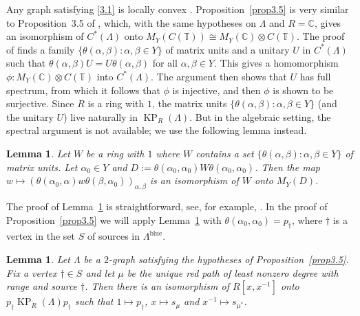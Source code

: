 \documentclass[a4paper,12pt]{amsart}
\numberwithin{equation}{section}
\newtheorem{lemma}[thm]{Lemma}
\theoremstyle{definition}
\theoremstyle{remark}
\begin{document}
Any graph satisfying \eqref{3.1}  is locally convex \cite[page~141]{PRRS}.
Proposition~\ref{prop3.5} is very similar to Proposition~3.5 of \cite{PRRS}, which, with the same hypotheses on $\Lambda$ and $R={\mathbb{C}}$, gives an isomorphism of $C^*(\Lambda)$ onto $M_Y(C({\mathbb{T}}))\cong M_Y({\mathbb{C}})\otimes C({\mathbb{T}})$. The proof of \cite[Proposition~3.5]{PRRS} finds a family $\{\theta(\alpha,\beta):\alpha,\beta\in Y\}$ of matrix units  and a unitary $U$ in $C^*(\Lambda)$ such that $\theta(\alpha,\beta)U=U\theta(\alpha,\beta)$ for all $\alpha, \beta\in Y$.  This gives a homomorphism $\phi:M_Y({\mathbb{C}})\otimes C({\mathbb{T}})$ into $C^*(\Lambda)$.  The argument then shows that $U$ has full spectrum, from which it follows that $\phi$ is injective, and then $\phi$ is shown to be surjective.
Since $R$ is a ring with $1$, the  matrix units $\{\theta(\alpha,\beta):\alpha,\beta\in Y\}$ (and the unitary $U$) live naturally in $\operatorname{KP}_R(\Lambda)$. But in the algebraic setting, the spectral argument is not available; we  use the following lemma instead.
 
\begin{lemma}\label{lemma-rowan}
Let $W$ be a ring with $1$ where $W$ contains a set $\{\theta(\alpha,\beta):\alpha,\beta \in Y\}$ of matrix units. Let $\alpha_0\in Y$ and $D:=\theta(\alpha_0,\alpha_0) W\theta(\alpha_0,\alpha_0)$. Then the map $w\mapsto (\theta(\alpha_0,\alpha)w\theta(\beta,\alpha_0))_{\alpha,\beta}$ is an isomorphism of $W$ onto $M_Y(D)$.
\end{lemma}
The proof of Lemma~\ref{lemma-rowan} is straightforward, see, for example, \cite[Proposition~13.9]{rowan}. In the proof of Proposition~\ref{prop3.5} we will apply Lemma~\ref{lemma-rowan} with $\theta(\alpha_0,\alpha_0)=p_\dagger$,  where $\dagger$ is a vertex in the set $S$ of sources in $\Lambda^{{\operatorname{\mathrm{blue}}}}$.

\begin{lemma}\label{lem-badapple}
Let $\Lambda$ be a $2$-graph satisfying the hypotheses of Proposition~\ref{prop3.5}. Fix a vertex $\dagger\in S$ and let $\mu$ be the unique red path of  least nonzero degree with range and source $\dagger$. Then there is an isomorphism of $R[x,x^{-1}]$ onto $p_{\dagger}\operatorname{KP}_R(\Lambda)p_{\dagger}$ such that $1\mapsto p_{\dagger}$, $x\mapsto s_\mu$ and $x^{-1}\mapsto s_{\mu^*}$.
\end{lemma}
\end{document}
